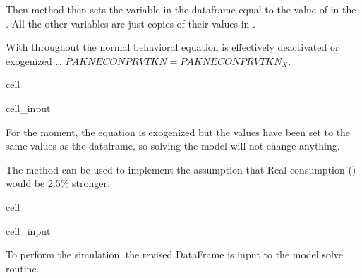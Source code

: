 \documentclass[letterpaper,10pt,english]{jupyterBook}
\begin{document}
\sphinxAtStartPar
Then  method then sets the variable  in the  dataframe equal to the value of  in the  . All the other variables are  just copies of their values in .

\sphinxAtStartPar
With  throughout the normal behavioral equation is effectively de\sphinxhyphen{}activated or exogenized … \(PAKNECONPRVTKN=PAKNECONPRVTKN_X\).

\begin{sphinxuseclass}{cell}\begin{sphinxVerbatimInput}

\begin{sphinxuseclass}{cell_input}
\begin{sphinxVerbatim}[commandchars=\\\{\}]
 
\end{sphinxVerbatim}

\end{sphinxuseclass}\end{sphinxVerbatimInput}

\end{sphinxuseclass}
\sphinxAtStartPar
For the moment, the equation is exogenized but the values have been set to the same values as the  dataframe, so solving the model will not change anything.

\sphinxAtStartPar
The  method can be used to implement the assumption that Real consumption () would be 2.5\% stronger.

\begin{sphinxuseclass}{cell}\begin{sphinxVerbatimInput}

\begin{sphinxuseclass}{cell_input}
\begin{sphinxVerbatim}[commandchars=\\\{\}]
\end{sphinxVerbatim}

\end{sphinxuseclass}\end{sphinxVerbatimInput}

\end{sphinxuseclass}
\sphinxAtStartPar
To perform the simulation, the revised  DataFrame is input to the  model solve routine.
\end{document}
